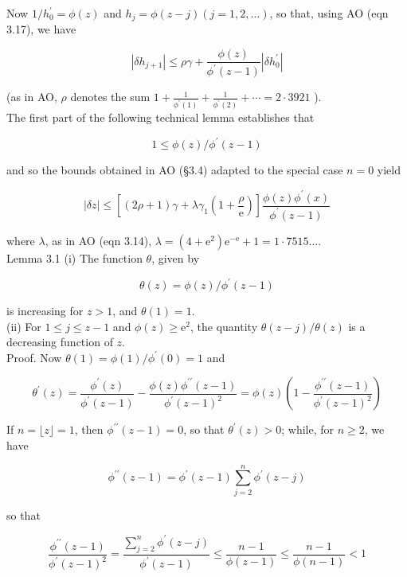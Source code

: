 \documentclass[10pt]{article}
\begin{document}
Now $1 / h_{0}^{\prime}=\phi(z)$ and $h_{j}=\phi(z-j)(j=1,2, \ldots)$, so that, using AO (eqn 3.17), we have


\begin{equation*}
\left|\delta h_{j+1}\right| \leqslant \rho \gamma+\frac{\phi(z)}{\phi^{\prime}(z-1)}\left|\delta h_{0}^{\prime}\right| \tag{3.1}
\end{equation*}


(as in AO, $\rho$ denotes the sum $1+\frac{1}{\phi^{\prime}(1)}+\frac{1}{\phi^{\prime}(2)}+\cdots=2 \cdot 3921$ ).\\
The first part of the following technical lemma establishes that

$$
1 \leqslant \phi(z) / \phi^{\prime}(z-1)
$$

and so the bounds obtained in AO (§3.4) adapted to the special case $n=0$ yield


\begin{equation*}
|\delta z| \leqslant\left[(2 \rho+1) \gamma+\lambda \gamma_{1}\left(1+\frac{\rho}{\mathrm{e}}\right)\right] \frac{\phi(z) \phi^{\prime}(x)}{\phi^{\prime}(z-1)} \tag{3.2}
\end{equation*}


where $\lambda$, as in AO (eqn 3.14), $\lambda=\left(4+\mathrm{e}^{2}\right) \mathrm{e}^{-\mathrm{e}}+1=1 \cdot 7515 \ldots$.\\
Lemma 3.1 (i) The function $\theta$, given by

$$
\theta(z)=\phi(z) / \phi^{\prime}(z-1)
$$

is increasing for $z>1$, and $\theta(1)=1$.\\
(ii) For $1 \leqslant j \leqslant z-1$ and $\phi(z) \geqslant \mathrm{e}^{2}$, the quantity $\theta(z-j) / \theta(z)$ is a decreasing function of $z$.\\
Proof. Now $\theta(1)=\phi(1) / \phi^{\prime}(0)=1$ and

$$
\theta^{\prime}(z)=\frac{\phi^{\prime}(z)}{\phi^{\prime}(z-1)}-\frac{\phi(z) \phi^{\prime \prime}(z-1)}{\phi^{\prime}(z-1)^{2}}=\phi(z)\left(1-\frac{\phi^{\prime \prime}(z-1)}{\phi^{\prime}(z-1)^{2}}\right)
$$

If $n=\lfloor z\rfloor=1$, then $\phi^{\prime \prime}(z-1)=0$, so that $\theta^{\prime}(z)>0$; while, for $n \geqslant 2$, we have

$$
\phi^{\prime \prime}(z-1)=\phi^{\prime}(z-1) \sum_{j=2}^{n} \phi^{\prime}(z-j)
$$

so that

$$
\frac{\phi^{\prime \prime}(z-1)}{\phi^{\prime}(z-1)^{2}}=\frac{\sum_{j=2}^{n} \phi^{\prime}(z-j)}{\phi^{\prime}(z-1)} \leqslant \frac{n-1}{\phi(z-1)} \leqslant \frac{n-1}{\phi(n-1)}<1
$$
\end{document}
